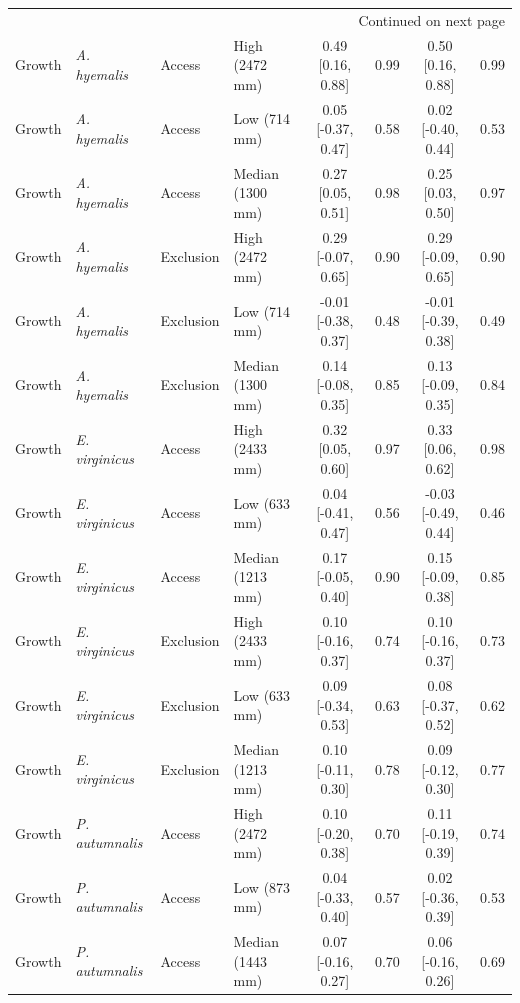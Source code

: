 \begin{landscape}
\begin{longtable}{llllcccc}
\midrule
\multicolumn{8}{r}{{Continued on next page}} \\
\endfoot

\bottomrule
\endlastfoot

  Growth & \textit{A. hyemalis} & Access & High (2472 mm) & 0.49 [0.16, 0.88] & 0.99 & 0.50 [0.16, 0.88] & 0.99 \\
  Growth & \textit{A. hyemalis} & Access & Low (714 mm) & 0.05 [-0.37, 0.47] & 0.58 & 0.02 [-0.40, 0.44] & 0.53 \\
  Growth & \textit{A. hyemalis} & Access & Median (1300 mm) & 0.27 [0.05, 0.51] & 0.98 & 0.25 [0.03, 0.50] & 0.97 \\
  Growth & \textit{A. hyemalis} & Exclusion & High (2472 mm) & 0.29 [-0.07, 0.65] & 0.90 & 0.29 [-0.09, 0.65] & 0.90 \\
  Growth & \textit{A. hyemalis} & Exclusion & Low (714 mm) & -0.01 [-0.38, 0.37] & 0.48 & -0.01 [-0.39, 0.38] & 0.49 \\
  Growth & \textit{A. hyemalis} & Exclusion & Median (1300 mm) & 0.14 [-0.08, 0.35] & 0.85 & 0.13 [-0.09, 0.35] & 0.84 \\
  Growth & \textit{E. virginicus} & Access & High (2433 mm) & 0.32 [0.05, 0.60] & 0.97 & 0.33 [0.06, 0.62] & 0.98 \\
  Growth & \textit{E. virginicus} & Access & Low (633 mm) & 0.04 [-0.41, 0.47] & 0.56 & -0.03 [-0.49, 0.44] & 0.46 \\
  Growth & \textit{E. virginicus} & Access & Median (1213 mm) & 0.17 [-0.05, 0.40] & 0.90 & 0.15 [-0.09, 0.38] & 0.85 \\
  Growth & \textit{E. virginicus} & Exclusion & High (2433 mm) & 0.10 [-0.16, 0.37] & 0.74 & 0.10 [-0.16, 0.37] & 0.73 \\
  Growth & \textit{E. virginicus} & Exclusion & Low (633 mm) & 0.09 [-0.34, 0.53] & 0.63 & 0.08 [-0.37, 0.52] & 0.62 \\
  Growth & \textit{E. virginicus} & Exclusion & Median (1213 mm) & 0.10 [-0.11, 0.30] & 0.78 & 0.09 [-0.12, 0.30] & 0.77 \\
  Growth & \textit{P. autumnalis} & Access & High (2472 mm) & 0.10 [-0.20, 0.38] & 0.70 & 0.11 [-0.19, 0.39] & 0.74 \\
  Growth & \textit{P. autumnalis} & Access & Low (873 mm) & 0.04 [-0.33, 0.40] & 0.57 & 0.02 [-0.36, 0.39] & 0.53 \\
  Growth & \textit{P. autumnalis} & Access & Median (1443 mm) & 0.07 [-0.16, 0.27] & 0.70 & 0.06 [-0.16, 0.26] & 0.69 \\

\end{longtable}
\end{landscape}
